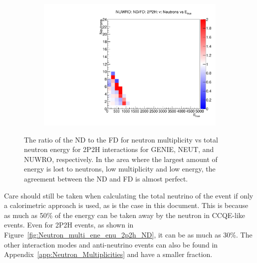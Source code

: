 \documentclass[12pt]{article}
\begin{document}
\begin{figure}
\begin{subfigure}[b]{0.32\textwidth}
  \includegraphics[width=\textwidth]{nneutrons_v_total_ene/Nneutrons_Total_ENe_2p2h_NUWRO_ND_FD_numu_norm.pdf}
\end{subfigure}
\caption{The ratio of the ND to the FD for neutron multiplicity vs total neutron energy for 2P2H interactions for GENIE, NEUT, and NUWRO, respectively.  In the area where the largest amount of energy is lost to neutrons, low multiplicity and low energy, the agreement between the ND and FD is almost perfect.} 
\label{fig:Neutron_multi_2p2h_ND_FD}
\end{figure}

Care should still be taken when calculating the total neutrino of the event if only a calorimetric approach is used, as is the case in this document.
This is because as much as 50\% of the energy can be taken away by the neutron in CCQE-like events.
Even for 2P2H events, as shown in Figure~\ref{fig:Neutron_multi_ene_enu_2p2h_ND}, it can be as much as 30\%.
The other interaction modes and anti-neutrino events can also be found in Appendix~\ref{app:Neutron_Multiplicities} and have a smaller fraction.
\end{document}
